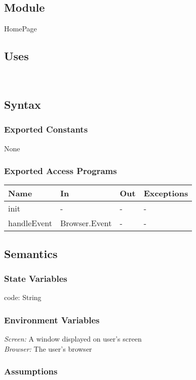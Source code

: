 \documentclass[12pt, titlepage]{article}
\begin{document}
\subsection{Module}
HomePage
\subsection{Uses}
\\

\subsection{Syntax}

\subsubsection{Exported Constants}
None
\subsubsection{Exported Access Programs}
\begin{center}
\begin{tabular}{p{2cm} p{4cm} p{4cm} p{2cm}}
\hline
\textbf{Name} & \textbf{In} & \textbf{Out} & \textbf{Exceptions} \\
\hline
init & - & - & - \\
handleEvent & Browser.Event & - & -\\
\hline
\end{tabular}
\end{center}
\subsection{Semantics}
\subsubsection{State Variables}

code: String

\subsubsection{Environment Variables}
\textit{Screen: } A window displayed on user's screen\\
\textit{Browser: } The user's browser

\subsubsection{Assumptions}
\end{document}
